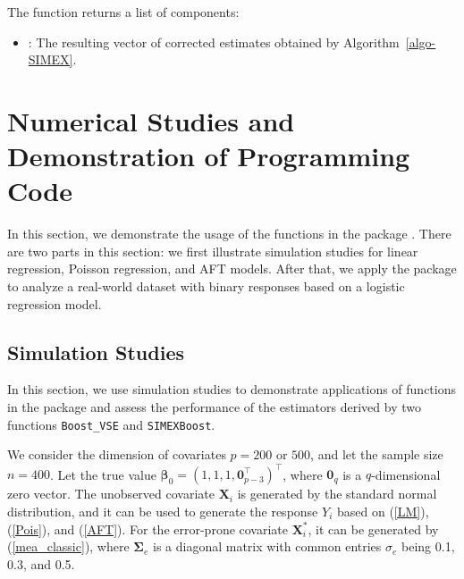 The function  returns a list of components:

\begin{itemize}
    \item {}:  The resulting vector of corrected {estimates} obtained by Algorithm~\ref{algo-SIMEX}. 
    

\end{itemize}

\section{Numerical Studies and Demonstration of Programming Code }
\label{Numerical}

In this section, we demonstrate the usage of the functions in the package . There are two parts in this section: we first illustrate simulation studies for linear regression, Poisson regression, and AFT  models. After that, we apply the package to analyze a {real-world} dataset with binary responses based on a logistic regression model.

\subsection{Simulation Studies}

In this section, we use simulation studies to demonstrate applications of functions in the package  and assess the performance of the estimators derived by two functions \texttt{Boost\_VSE} and \texttt{SIMEXBoost}.


We consider the dimension of covariates $p=200$ or $500$, and let the sample size $n=400$. Let the true value $\boldsymbol{\beta}_0 = (1,1,1,\mathbf{0}_{p-3}^\top)^\top$, where $\mathbf{0}_q$ is a $q$-dimensional zero vector. The unobserved covariate $\mathbf{X}_i$ is generated by the standard normal distribution, and it can be used to generate the response $Y_i$ based on (\ref{LM}), (\ref{Pois}), and (\ref{AFT}). For the error-prone covariate $\mathbf{X}_i^\ast$, it can be generated by (\ref{mea_classic}), where $\boldsymbol{\Sigma}_e$ is a diagonal matrix with common entries $\sigma_e$ being 0.1, 0.3, and 0.5. 

